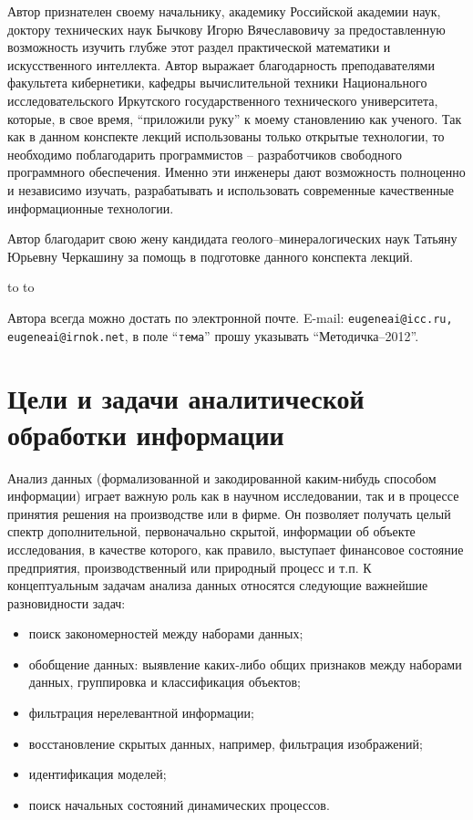 \documentclass[12pt, openany, twoside]{book} %
\begin{document}
Автор признателен своему начальнику, академику Российской академии наук, доктору технических наук Бычкову Игорю Вячеславовичу за предоставленную возможность изучить глубже этот раздел практической математики и искусственного интеллекта. Автор выражает благодарность преподавателями факультета кибернетики, кафедры вычислительной техники Национального исследовательского Иркутского государственного технического университета, которые, в свое время, ``приложили руку'' к моему становлению как ученого. Так как в данном конспекте лекций использованы только открытые технологии, то необходимо поблагодарить программистов -- разработчиков свободного программного обеспечения. Именно эти инженеры дают возможность полноценно и независимо изучать, разрабатывать и использовать современные качественные информационные технологии.

Автор благодарит свою жену кандидата геолого--минералогических наук Татьяну Юрьевну Черкашину за помощь в подготовке данного конспекта лекций.

\medskip
\noindent\hbox to \linewidth{\hfill\sf с.н.с. ИДСТУ СО РАН, доцента кафедры ВТ
ИрГТУ,}
\noindent\hbox to \linewidth{\hfill\sf к.т.н. Черкашин Е.А.}

\vfill
\makeatletter
{} Автора всегда можно достать по электронной почте. E-mail:
{\tt eugeneai@icc.ru, eugeneai@irnok.net}, в поле ``{\tt тема}'' прошу указывать ``Методичка--2012''.
\makeatother

\chapter{Цели и задачи аналитической обработки информации}

Анализ данных (формализованной и закодированной каким-нибудь способом информации) играет важную роль как в научном исследовании, так и в процессе принятия решения на производстве или в фирме. Он позволяет получать целый спектр дополнительной, первоначально скрытой,  информации об объекте исследования, в качестве которого, как правило, выступает финансовое состояние предприятия, производственный или природный процесс и т.п. К концептуальным задачам анализа данных относятся следующие важнейшие разновидности задач:
\begin{itemize}
\item поиск закономерностей между наборами данных;
\item обобщение данных: выявление каких-либо общих признаков между наборами данных, группировка и классификация объектов;
\item фильтрация нерелевантной информации;
\item восстановление скрытых данных, например, фильтрация изображений;
\item идентификация моделей;
\item поиск начальных состояний динамических процессов.
\end{itemize}
\end{document}
